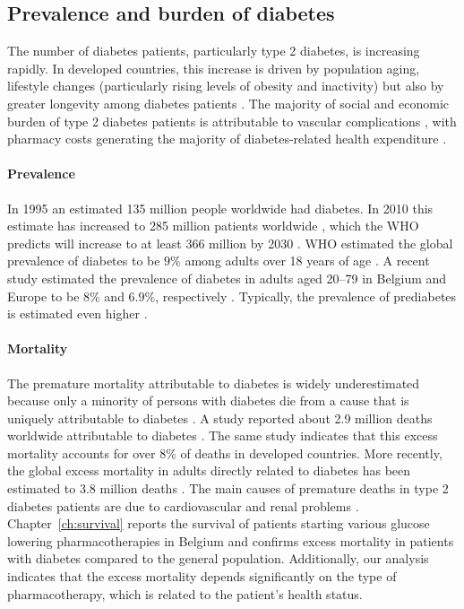 
\subsection{Prevalence and burden of diabetes}
The number of diabetes patients, particularly type 2 diabetes, is increasing rapidly. In developed countries, this increase is driven by population aging, lifestyle changes (particularly rising levels of obesity and inactivity) but also by greater longevity among diabetes patients \citep{stovring2003rising,beulens2010global}. The majority of social and economic burden of type 2 diabetes patients is attributable to vascular complications \citep{beulens2010global}, with pharmacy costs generating the majority of diabetes-related health expenditure \citep{nichols2002impact, gandra2006total}.

\paragraph{Prevalence} In 1995 an estimated 135 million people worldwide had diabetes. In 2010 this estimate has increased to 285 million patients worldwide \citep{shaw2010global, chen2012worldwide}, which the WHO predicts will increase to at least 366 million by 2030 \citep{smyth2006diabetes}. WHO estimated the global prevalence of diabetes to be $9\%$ among adults over 18 years of age \citep{alwan2011global}. A recent study estimated the prevalence of diabetes in adults aged 20--79 in Belgium and Europe to be $8\%$ and $6.9\%$, respectively \citep{shaw2010global}. Typically, the prevalence of prediabetes is estimated even higher \citep{cowie2009full,yang2010prevalence,chen2012worldwide}.

\paragraph{Mortality} 
The premature mortality attributable to diabetes is widely underestimated because only a minority of persons with diabetes die from a cause that is uniquely attributable to diabetes \citep{beulens2010global}. A study reported about 2.9 million deaths worldwide attributable to diabetes \citep{roglic2005burden}. The same study indicates that this excess mortality accounts for over $8\%$ of deaths in developed countries. More recently, the global excess mortality in adults directly related to diabetes has been estimated to 3.8 million deaths \citep{beulens2010global}. The main causes of premature deaths in type 2 diabetes patients are due to cardiovascular and renal problems \citep{morrish2001mortality, beulens2010global}. 
Chapter~\ref{ch:survival} reports the survival of patients starting various glucose lowering pharmacotherapies in Belgium and confirms excess mortality in patients with diabetes compared to the general population. Additionally, our analysis indicates that the excess mortality depends significantly on the type of pharmacotherapy, which is related to the patient's health status.


